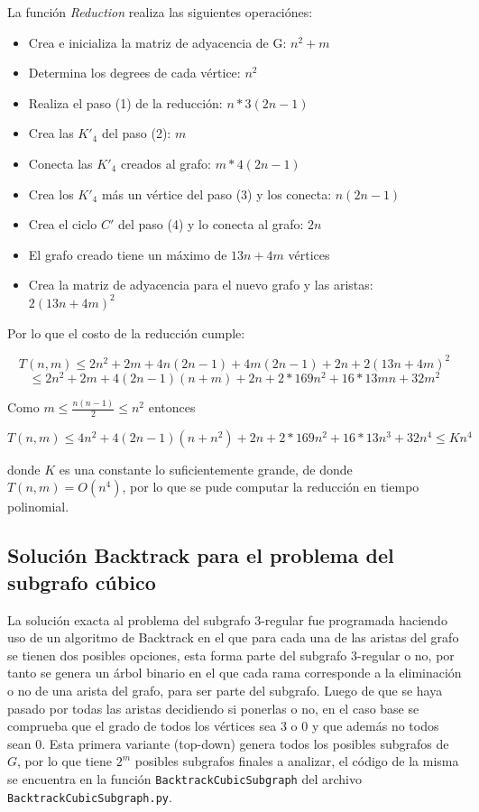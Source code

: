 \documentclass{article}
\begin{document}
La funci\'on \textit{Reduction} realiza las siguientes operaci\'ones: 

\begin{itemize}
    \item Crea e inicializa la matriz de adyacencia de G: $n^2 + m$
    \item Determina los degrees de cada v\'ertice: $n^2$
    \item Realiza el paso (1) de la reducci\'on: $n * 3(2n-1)$
    \item Crea las $K'_4$ del paso (2): $m$
    \item Conecta las $K'_4$ creados al grafo: $m * 4(2n-1)$
    \item Crea los $K'_4$ m\'as un v\'ertice del paso (3) y los conecta: $n(2n -1) $
    \item Crea el ciclo $C'$ del paso (4) y lo conecta al grafo: $2n$
    \item El grafo creado tiene un m\'aximo de $13 n + 4m$ v\'ertices
    \item Crea la matriz de adyacencia para el nuevo grafo y las aristas: $2(13 n + 4m)^2$
\end{itemize}

Por lo que el costo de la reducci\'on cumple:

$$T(n,m) \leq 2n^2 + 2m + 4n(2n-1) + 4m(2n-1) + 2n + 2(13 n + 4m)^2$$
$$\leq 2n^2 + 2m + 4(2n-1)(n+m) + 2n + 2*169n^2 + 16*13mn + 32m^2$$

Como $m \leq \frac{n(n-1)}{2} \leq n^2$ entonces

$$T(n,m) \leq 4n^2 + 4(2n-1)(n+n^2) + 2n + 2*169n^2 + 16*13n^3 + 32n^4 \leq Kn^4$$ 

donde $K$ es una constante lo suficientemente grande, de donde $T(n,m) = O(n^4)$, por lo 
que se pude computar la reducci\'on en tiempo polinomial.

\subsection*{Soluci\'on Backtrack para el problema del subgrafo c\'ubico}
La soluci\'on exacta al problema del subgrafo $3$-regular fue programada haciendo uso de un algoritmo de Backtrack en el que para cada una de las aristas del grafo se tienen 
dos posibles opciones, esta forma parte del subgrafo $3$-regular o no, por tanto se genera un \'arbol binario en el que cada rama corresponde a la eliminaci\'on o no de una arista
del grafo, para ser parte del subgrafo. Luego de que se haya pasado por todas las aristas decidiendo si ponerlas o no, en el caso base se comprueba que el grado de todos los v\'ertices sea $3$ o $0$
y que adem\'as no todos sean $0$. Esta primera variante (top-down) genera todos los posibles subgrafos de $G$, por lo que tiene $2^m$ posibles subgrafos finales a analizar, el c\'odigo de la misma se encuentra
en la funci\'on \texttt{BacktrackCubicSubgraph} del archivo \texttt{BacktrackCubicSubgraph.py}.\\ 
\end{document}
